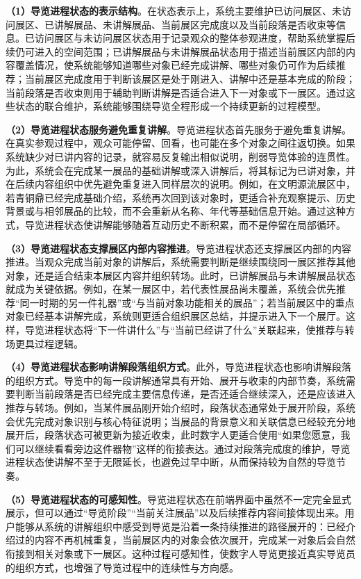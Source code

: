 \textbf{（1）导览进程状态的表示结构}。在状态表示上，系统主要维护已访问展区、未访问展区、已讲解展品、未讲解展品、当前展区完成度以及当前段落是否收束等信息。已访问展区与未访问展区状态用于记录观众的整体参观进度，帮助系统掌握后续仍可进入的空间范围；已讲解展品与未讲解展品状态用于描述当前展区内部的内容覆盖情况，使系统能够知道哪些对象已经完成讲解、哪些对象仍可作为后续推荐；当前展区完成度用于判断该展区是处于刚进入、讲解中还是基本完成的阶段；当前段落是否收束则用于辅助判断讲解是否适合进入下一对象或下一展区。通过这些状态的联合维护，系统能够围绕导览全程形成一个持续更新的过程模型。

\textbf{（2）导览进程状态服务避免重复讲解}。导览进程状态首先服务于避免重复讲解。在真实参观过程中，观众可能停留、回看，也可能在多个对象之间往返切换。如果系统缺少对已讲内容的记录，就容易反复输出相似说明，削弱导览体验的连贯性。为此，系统会在完成某一展品的基础讲解或深入讲解后，将其标记为已讲对象，并在后续内容组织中优先避免重复进入同样层次的说明。例如，在文明源流展区中，若青铜鼎已经完成基础介绍，系统再次回到该对象时，更适合补充观察提示、历史背景或与相邻展品的比较，而不会重新从名称、年代等基础信息开始。通过这种方式，导览进程状态使讲解能够随着互动历史不断积累，而不是停留在局部循环。

\textbf{（3）导览进程状态支撑展区内部内容推进}。导览进程状态还支撑展区内部的内容推进。当观众完成当前对象的讲解后，系统需要判断是继续围绕同一展区推荐其他对象，还是适合结束本展区内容并组织转场。此时，已讲解展品与未讲解展品状态就成为关键依据。例如，在某一展区中，若代表性展品尚未覆盖，系统会优先推荐“同一时期的另一件礼器”或“与当前对象功能相关的展品”；若当前展区中的重点对象已经基本讲解完成，系统则更适合组织展区总结，并提示进入下一个展厅。这样，导览进程状态将“下一件讲什么”与“当前已经讲了什么”关联起来，使推荐与转场更具过程逻辑。

\textbf{（4）导览进程状态影响讲解段落组织方式}。此外，导览进程状态也影响讲解段落的组织方式。导览中的每一段讲解通常具有开始、展开与收束的内部节奏，系统需要判断当前段落是否已经完成主要信息传递，是否还适合继续深入，还是应该进入推荐与转场。例如，当某件展品刚开始介绍时，段落状态通常处于展开阶段，系统会优先完成对象识别与核心特征说明；当展品的背景意义和关联信息已经较充分地展开后，段落状态可被更新为接近收束，此时数字人更适合使用“如果您愿意，我们可以继续看看旁边这件器物”这样的衔接表达。通过对段落完成度的维护，导览进程状态使讲解不至于无限延长，也避免过早中断，从而保持较为自然的导览节奏。

\textbf{（5）导览进程状态的可感知性}。导览进程状态在前端界面中虽然不一定完全显式展示，但可以通过“导览阶段”“当前关注展品”以及后续推荐内容间接体现出来。用户能够从系统的讲解组织中感受到导览是沿着一条持续推进的路径展开的：已经介绍过的内容不再机械重复，当前展区内的对象会依次展开，完成某一对象后会自然衔接到相关对象或下一展区。这种过程可感知性，使数字人导览更接近真实导览员的组织方式，也增强了导览过程中的连续性与方向感。


